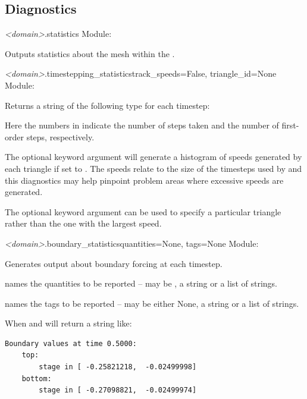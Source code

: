 \documentclass{manual}
\begin{document}
\subsection{Diagnostics}
\label{sec:diagnostics}

\begin{methoddesc}{\emph{<domain>}.statistics}{}
Module: 

Outputs statistics about the mesh within the .
\end{methoddesc}

\begin{methoddesc}{\emph{<domain>}.timestepping_statistics}{track_speeds=False, triangle_id=None}
Module: 

Returns a string of the following type for each timestep:\\

Here the numbers in  indicate the number of steps taken and
the number of first-order steps, respectively.

The optional keyword argument  will
generate a histogram of speeds generated by each triangle if set to . The
speeds relate to the size of the timesteps used by \anuga and
this diagnostics may help pinpoint problem areas where excessive speeds
are generated.

The optional keyword argument  can be used to specify a particular
triangle rather than the one with the largest speed.
\end{methoddesc}

\begin{methoddesc}{\emph{<domain>}.boundary_statistics}{quantities=None,
                                                      tags=None}
Module: 

Generates output about boundary forcing at each timestep.

 names the quantities to be reported -- may be ,
a string or a list of strings.

 names the tags to be reported -- may be either None, a string or a list of strings.

When  and 
will return a string like:

\begin{verbatim}
Boundary values at time 0.5000:
    top:
        stage in [ -0.25821218,  -0.02499998]
    bottom:
        stage in [ -0.27098821,  -0.02499974]
\end{verbatim}
\end{methoddesc}
\end{document}
